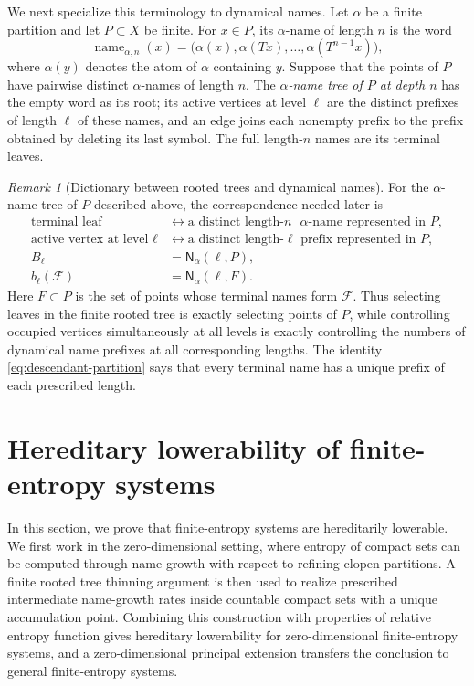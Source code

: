 \documentclass[12pt,letterpaper,reqno]{amsart}
\newcommand{\Nname}{\mathsf N}
\theoremstyle{definition}
\theoremstyle{remark}
\newtheorem{remark}[theorem]{Remark}
\numberwithin{equation}{section}
\begin{document}
	We next specialize this terminology to dynamical names.  Let $\alpha$ be a
	finite partition and let $P\subset X$ be finite.  For $x\in P$, its
	$\alpha$-name of length $n$ is the word
	\[
	\operatorname{name}_{\alpha,n}(x)
	=
	\bigl(\alpha(x),\alpha(Tx),\ldots,\alpha(T^{n-1}x)\bigr),
	\]
	where $\alpha(y)$ denotes the atom of $\alpha$ containing $y$.  Suppose that
	the points of $P$ have pairwise distinct $\alpha$-names of length $n$.  The
	\emph{$\alpha$-name tree of $P$ at depth $n$} has the empty word as its root;
	its active vertices at level $\ell$ are the distinct prefixes of length
	$\ell$ of these names, and an edge joins each nonempty prefix to the prefix
	obtained by deleting its last symbol.  The full length-$n$ names are its
	terminal leaves.

	\begin{remark}[Dictionary between rooted trees and dynamical names]
		\label{rem:name-tree-dictionary}
		For the $\alpha$-name tree of $P$ described above, the correspondence needed
		later is
		\begin{align*}
		\text{terminal leaf}
		&\longleftrightarrow
		\text{a distinct length-$n$ $\alpha$-name represented in $P$},\\
		\text{active vertex at level $\ell$}
		&\longleftrightarrow
		\text{a distinct length-$\ell$ prefix represented in $P$},\\
		B_\ell
		&=
		\Nname_\alpha(\ell,P),\\
		b_\ell(\mathcal F)
		&=
		\Nname_\alpha(\ell,F).
		\end{align*}
		Here $F\subset P$ is the set of points whose terminal names form
		$\mathcal F$.  Thus selecting leaves in the finite rooted tree is exactly
		selecting points of $P$, while controlling occupied vertices simultaneously
		at all levels is exactly controlling the numbers of dynamical name prefixes
		at all corresponding lengths.  The identity
		\eqref{eq:descendant-partition} says that every terminal name has a unique
		prefix of each prescribed length.
	\end{remark}
	

	
	\section{Hereditary lowerability of finite-entropy systems}
	\label{sec:finite-part}
    In this section, we prove that finite-entropy systems are hereditarily lowerable. We first work in the zero-dimensional setting, where entropy of compact sets can be computed through name growth with respect to refining clopen partitions. A finite rooted tree thinning argument is then used to realize prescribed intermediate name-growth rates inside countable compact sets with a unique accumulation point. Combining this construction with properties of relative entropy function gives hereditary lowerability for zero-dimensional finite-entropy systems, and a zero-dimensional principal extension transfers the conclusion to general finite-entropy systems.
    
\end{document}
